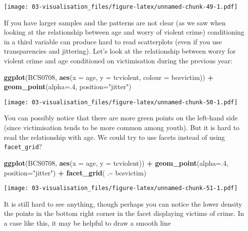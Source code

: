 \documentclass[
]{book}
\newenvironment{Shaded}{\begin{snugshade}}{\end{snugshade}}
\newcommand{\AttributeTok}[1]{\textcolor[rgb]{0.13,0.29,0.53}{#1}}
\newcommand{\DecValTok}[1]{\textcolor[rgb]{0.00,0.00,0.81}{#1}}
\newcommand{\FunctionTok}[1]{\textcolor[rgb]{0.13,0.29,0.53}{\textbf{#1}}}
\newcommand{\NormalTok}[1]{#1}
\newcommand{\SpecialCharTok}[1]{\textcolor[rgb]{0.81,0.36,0.00}{\textbf{#1}}}
\newcommand{\StringTok}[1]{\textcolor[rgb]{0.31,0.60,0.02}{#1}}
\begin{document}
\texttt{[image: 03-visualisation\_files/figure-latex/unnamed-chunk-49-1.pdf]}

If you have larger samples and the patterns are not clear (as we saw when looking at the relationship between age and worry of violent crime) conditioning in a third variable can produce hard to read scatterplots (even if you use transparencies and jittering). Let's look at the relationship between worry for violent crime and age conditioned on victimisation during the previous year:

\begin{Shaded}
\begin{Highlighting}[]
\FunctionTok{ggplot}\NormalTok{(BCS0708, }\FunctionTok{aes}\NormalTok{(}\AttributeTok{x =}\NormalTok{ age, }\AttributeTok{y =}\NormalTok{ tcviolent, }\AttributeTok{colour =}\NormalTok{ bcsvictim)) }\SpecialCharTok{+}
  \FunctionTok{geom\_point}\NormalTok{(}\AttributeTok{alpha=}\NormalTok{.}\DecValTok{4}\NormalTok{, }\AttributeTok{position=}\StringTok{"jitter"}\NormalTok{)}
\end{Highlighting}
\end{Shaded}

\texttt{[image: 03-visualisation\_files/figure-latex/unnamed-chunk-50-1.pdf]}

You can possibly notice that there are more green points on the left-hand side (since victimisation tends to be more common among youth). But it is hard to read the relationship with age. We could try to use facets instead of using \texttt{facet\_grid}?

\begin{Shaded}
\begin{Highlighting}[]
\FunctionTok{ggplot}\NormalTok{(BCS0708, }\FunctionTok{aes}\NormalTok{(}\AttributeTok{x =}\NormalTok{ age, }\AttributeTok{y =}\NormalTok{ tcviolent)) }\SpecialCharTok{+}
  \FunctionTok{geom\_point}\NormalTok{(}\AttributeTok{alpha=}\NormalTok{.}\DecValTok{4}\NormalTok{, }\AttributeTok{position=}\StringTok{"jitter"}\NormalTok{) }\SpecialCharTok{+}
  \FunctionTok{facet\_grid}\NormalTok{( .}\SpecialCharTok{\textasciitilde{}}\NormalTok{ bcsvictim)}
\end{Highlighting}
\end{Shaded}

\texttt{[image: 03-visualisation\_files/figure-latex/unnamed-chunk-51-1.pdf]}

It is still hard to see anything, though perhaps you can notice the lower density the points in the bottom right corner in the facet displaying victims of crime. In a case like this, it may be helpful to draw a smooth line
\end{document}
